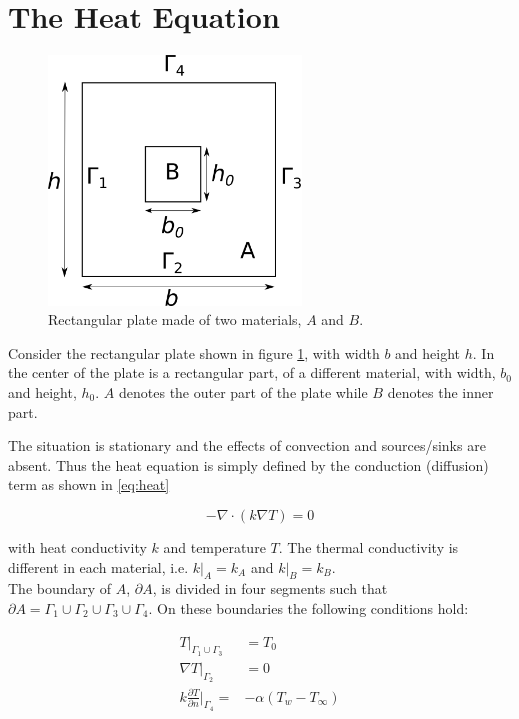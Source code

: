 \documentclass[10pt,a4paper]{article}
\begin{document}
\section{The Heat Equation}
	\begin{figure}[h]
		\centering
		\includegraphics[width=0.6\textwidth]{schem.png}
		\caption{Rectangular plate made of two materials, $A$ and $B$.}
		\label{fig:schem}
	\end{figure}
Consider the rectangular plate shown in figure \ref{fig:schem}, with width $b$ and height $h$. In the center of the plate is a rectangular part, of a different material, with width, $b_0$ and height, $h_0$. $A$ denotes the outer part of the plate while $B$ denotes the inner part.

The situation is stationary and the effects of convection and sources/sinks are absent. Thus the heat equation is simply defined by the conduction (diffusion) term as shown in \eqref{eq:heat}

\begin{equation}\label{eq:heat}
	-\nabla \cdot (k \nabla T) = 0
\end{equation}

with heat conductivity $k$ and temperature $T$. The thermal conductivity is different in each material, i.e. $ k|_A = k_A $ and $k|_B = k_B $.\\

The boundary of $A$, $\partial A$,  is divided in four segments such that $\partial A = \Gamma_1 \cup  \Gamma_2 \cup  \Gamma_3 \cup  \Gamma_4$. On these boundaries the following conditions hold:

\begin{align}
T\rvert_{\Gamma_1\cup\Gamma_3}& = T_0 \label{eq:bc13}\\
\nabla T\rvert_{\Gamma_2} &= 0\label{eq:bc2}\\
k\frac{\partial T}{\partial n}\rvert_{\Gamma_4}=&-\alpha(T_w - T_{\infty})\label{eq:bc4}
\end{align}
\end{document}
